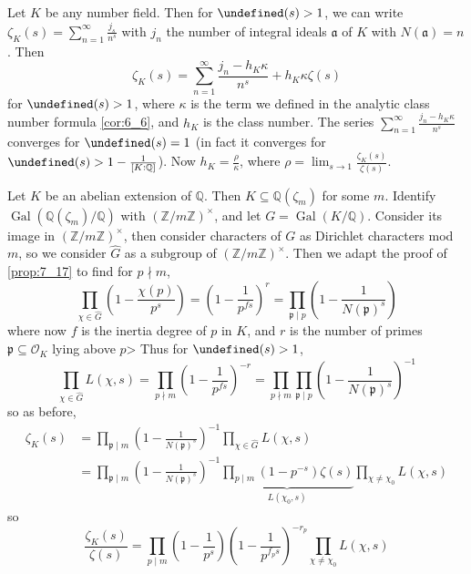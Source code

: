 \documentclass[11pt]{article}
\theoremstyle{definition}
\theoremstyle{plain}
\theoremstyle{remark}
\let\Re\undefined
\DeclareMathOperator{\Re}{Re}
\DeclareMathOperator{\Gal}{Gal}
\newcommand{\ZZ}{\mathbb{Z}}
\newcommand{\QQ}{\mathbb{Q}}
\newcommand{\cO}{\mathcal{O}}
\newcommand{\fa}{\mathfrak{a}}
\newcommand{\fp}{\mathfrak{p}}
\begin{document}
Let $K$ be any number field. Then for $\Re(s) > 1$, we can write $\zeta_K(s) = \sum_{n=1}^\infty \frac{j_s}{n^s}$ with $j_n$ the number of integral ideals $\fa$ of $K$ with $N(\fa) = n$. Then
\begin{equation*}
    \zeta_K(s) = \sum_{n=1}^\infty \frac{j_n - h_K \kappa}{n^s} + h_K \kappa \zeta(s)
\end{equation*}
for $\Re(s) > 1$, where $\kappa$ is the term we defined in the analytic class number formula \autoref{cor:6_6}, and $h_K$ is the class number. The series $\sum_{n=1}^\infty \frac{j_n - h_K \kappa}{n^s}$ converges for $\Re(s) = 1$ (in fact it converges for $\Re(s) > 1 - \frac{1}{[K : \QQ]}$). Now $h_K = \frac{\rho}{\kappa}$, where $\rho = \lim_{s \to 1} \frac{\zeta_K(s)}{\zeta(s)}$.

Let $K$ be an abelian extension of $\QQ$. Then $K \subseteq \QQ(\zeta_m)$ for some $m$. Identify $\Gal(\QQ(\zeta_m) / \QQ)$ with $(\ZZ / m\ZZ)^\times$, and let $G = \Gal(K / \QQ)$. Consider its image in $(\ZZ / m\ZZ)^\times$, then consider characters of $G$ as Dirichlet characters mod $m$, so we consider $\widehat{G}$ as a subgroup of $(\ZZ / m\ZZ)^\times$. Then we adapt the proof of \autoref{prop:7_17} to find for $p \nmid m$,
\begin{equation*}
    \prod_{\chi \in \widehat{G}} \left(1 - \frac{\chi(p)}{p^s}\right) = \left(1 - \frac{1}{p^{fs}}\right)^r = \prod_{\fp \mid p} \left(1 - \frac{1}{N(\fp)^s}\right)
\end{equation*}
where now $f$ is the inertia degree of $p$ in $K$, and $r$ is the number of primes $\fp \subseteq \cO_K$ lying above $p$> Thus for $\Re(s) > 1$,
\begin{equation*}
    \prod_{\chi \in \widehat{G}} L(\chi, s) = \prod_{p \nmid m} \left(1 - \frac{1}{p^{fs}}\right)^{-r} = \prod_{p \nmid m} \prod_{\fp \mid p} \left(1 - \frac{1}{N(\fp)^s}\right)^{-1}
\end{equation*}
so as before,
\begin{align*}
    \zeta_K(s)
    &= \prod_{\fp \mid m} \left(1 - \frac{1}{N(\fp)^s}\right)^{-1} \prod_{\chi \in \widehat{G}} L(\chi, s)\\
    &= \prod_{\fp \mid m} \left(1 - \frac{1}{N(\fp)^s}\right)^{-1} \underbrace{\prod_{p \mid m} (1-p^{-s}) \zeta(s)}_{L(\chi_0, s)} \prod_{\chi \neq \chi_0} L(\chi, s)
\end{align*}
so
\begin{equation*}
    \frac{\zeta_K(s)}{\zeta(s)} = \prod_{p \mid m} \left(1-\frac{1}{p^s}\right) \left(1-\frac{1}{p^{f_p s}}\right)^{-r_p} \prod_{\chi \neq \chi_0} L(\chi, s)
\end{equation*}
\end{document}
